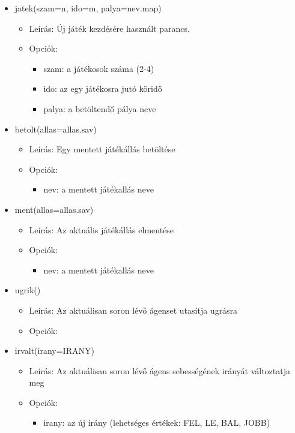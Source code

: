 \begin{itemize}

    \item jatek(szam=n, ido=m, palya=nev.map)
	\begin{itemize}
	    \item Leírás: Új játék kezdésére használt parancs.
	    \item Opciók:
            \begin{itemize}
                \item szam: a játékosok száma (2-4)
                \item ido: az egy játékosra jutó köridő
                \item palya: a betöltendő pálya neve
            \end{itemize}
	\end{itemize}
    
    \item betolt(allas=allas.sav)
    \begin{itemize}
        \item Leírás: Egy mentett játékállás betöltése
        \item Opciók: 
            \begin{itemize}
                \item nev: a mentett játékallás neve
            \end{itemize}
    \end{itemize}
    
    \item ment(allas=allas.sav)
    \begin{itemize}
         \item Leírás: Az aktuális játékállás elmentése
         \item Opciók: 
             \begin{itemize}
                 \item nev: a mentett játékallás neve
             \end{itemize}
    \end{itemize}

    \item ugrik()
    \begin{itemize}
        \item Leírás: Az aktuálisan soron lévő ágenset utasítja ugrásra
        \item Opciók: 
    \end{itemize}
    
    \item irvalt(irany=IRANY)
    \begin{itemize}
        \item Leírás: Az aktuálisan soron lévő ágens sebességének irányát változtatja meg
        \item Opciók: 
            \begin{itemize}
                \item irany: az új irány (lehetséges értékek: FEL, LE, BAL, JOBB)
            \end{itemize}
    \end{itemize}
    

\end{itemize}
